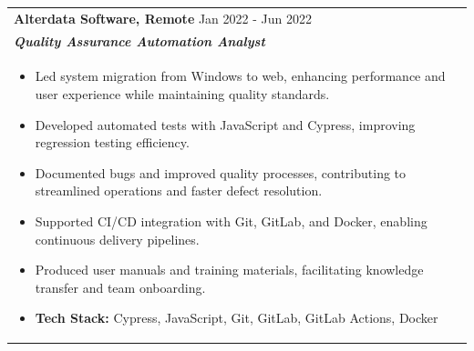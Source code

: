 \documentclass[a4paper,8pt]{article}
\begin{document}
\begin{tabularx}{\linewidth}{ @{}l r@{} }
\textbf{{Alterdata Software, Remote}} \hfill \color[HTML]{371e77} Jan 2022 - Jun 2022 \\[4pt]
\color[HTML]{371e77}\textbf{\textit{Quality Assurance Automation Analyst}}\ \hfill \color[HTML]{4B28A4} \\[5pt]
\begin{minipage}[t]{\linewidth}
    \begin{itemize}[nosep,after=\strut, leftmargin=2em, itemsep=2pt]
        \item Led system migration from Windows to web, enhancing performance and user experience while maintaining quality standards.
        \item Developed automated tests with JavaScript and Cypress, improving regression testing efficiency.
        \item Documented bugs and improved quality processes, contributing to streamlined operations and faster defect resolution.
        \item Supported CI/CD integration with Git, GitLab, and Docker, enabling continuous delivery pipelines.
        \item Produced user manuals and training materials, facilitating knowledge transfer and team onboarding.
        \item \textbf{Tech Stack:} Cypress, JavaScript, Git, GitLab, GitLab Actions, Docker
    \end{itemize}
\end{minipage}
\end{tabularx}
\end{document}
